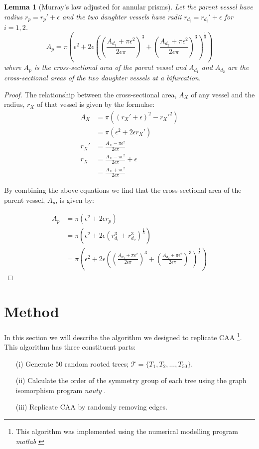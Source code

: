 \documentclass[10pt]{amsart} %
\newtheorem{lem}[thm]{Lemma}
\theoremstyle{definition}
\begin{document}
\begin{lem}[Murray's law adjusted for annular prisms]\label{lem:murr}
Let the parent vessel have radius $r_{p} = r_{p}' + \epsilon$ and the two 
daughter vessels have radii $r_{d_i} = r_{d_i}' + \epsilon$ for $i = 1,2$.
 \[A_p = \pi\left(\epsilon^{2} + 2\epsilon \left(\left( \frac{A_{d_{1}} + \pi\epsilon^{2}}{2\epsilon\pi} \right)^{3} + \left( \frac{A_{d_{2}} + \pi\epsilon^{2}}{2\epsilon\pi} \right)^{3}\right)^{\frac{1}{3}}\right)\]
where $A_p$ is the cross-sectional area of the parent vessel and $A_{d_{1}}$ and $A_{d_{2}}$ are the cross-sectional areas of the two daughter vessels at a bifurcation.
\end{lem}
\begin{proof}
The relationship between the cross-sectional area, $A_{X}$ of any vessel and the radius, $r_{X}$ 
of that vessel is given by the formulae:
\begin{align*}
 A_{X} &= \pi((r_{X}' + \epsilon)^{2} - r_{X}'^{2})\\
 &= \pi(\epsilon^{2} + 2\epsilon r_{X}')\\
 r_{X}' &= \frac{A_{X} - \pi\epsilon^{2}}{2\epsilon\pi}\\
 r_{X} &=  \frac{A_{X} - \pi\epsilon^{2}}{2\epsilon\pi} + \epsilon \\
 &= \frac{A_{X} + \pi\epsilon^{2}}{2\epsilon\pi}
\end{align*}

By combining the above equations we find that the cross-sectional area of the parent
 vessel, $A_{p}$, is given by:

\begin{align*}
A_{p} &= \pi(\epsilon^{2} + 2\epsilon r_{p}) \\
&= \pi\left(\epsilon^{2} + 2\epsilon (r_{d_{1}}^{3} + r_{d_{2}}^{3})^{\frac{1}{3}}\right)\\
&= \pi\left(\epsilon^{2} + 2\epsilon \left(\left( \frac{A_{d_{1}} + \pi\epsilon^{2}}{2\epsilon\pi} \right)^{3} + \left( \frac{A_{d_{2}} + \pi\epsilon^{2}}{2\epsilon\pi} \right)^{3}\right)^{\frac{1}{3}}\right)
\end{align*}
\end{proof}

\section{Method}\label{sec:meth}

In this section we will describe the algorithm we designed to replicate CAA \footnote{This algorithm was implemented using the numerical modelling program \emph{matlab} \cite{matlab}}.  This algorithm has three constituent parts:
\begin{itemize}
\item[(i)] Generate 50 random rooted trees; $\mathcal{T} = \{ T_1,T_2,\dots,T_{50}\}$.
\item[(ii)]Calculate the order of the symmetry group of each tree using the graph isomorphism program \emph{nauty} \cite{nauty}.
\item[(iii)] Replicate CAA by randomly removing edges. 
\end{itemize} 
\end{document}
